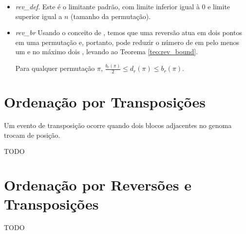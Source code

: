 \begin{itemize}
\item{\textit{rev\_def}. 
Este é o limitante padrão, com limite inferior igual à 0 e limite
superior igual a $n$ (tamanho da permutação).}
\item{\textit{rev\_br}
Usando o conceito de \bkp{}, temos que uma reversão atua em dois
pontos em uma permutação e, portanto, pode reduzir o número de \bkp{}
em pelo menos um e no máximo dois \cite{BafnaPevzner*1996}, levando ao
Teorema \ref{teo:rev_bound}.

\begin{teo}
\label{teo:rev_bound}
Para qualquer permutação $\pi$, $\frac{b_r(\pi)}{2} \leq d_r(\pi) \leq
  b_r(\pi)$.
\end{teo}}
\end{itemize}

\section{Ordenação por Transposições}
\label{sec:trans}

Um evento de transposição ocorre quando dois blocos adjacentes no
genoma trocam de posição.

TODO

\section{Ordenação por Reversões e Transposições}
\label{sec:rev_trans}
TODO
